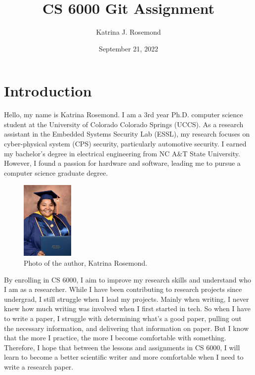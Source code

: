 \documentclass{article}
\title{CS 6000 Git Assignment}
\author{Katrina J. Rosemond}
\date{September 21, 2022}
\begin{document}
\maketitle

\section{Introduction}

Hello, my name is Katrina Rosemond. I am a 3rd year Ph.D. computer science 
student at the University of Colorado Colorado Springs (UCCS). As a 
research assistant in the Embedded Systems Security Lab (ESSL), my 
research focuses on cyber-physical system (CPS) security, particularly 
automotive security. I earned my bachelor's degree in electrical 
engineering from NC A\&T State University. However, I found a passion for 
hardware and software, leading me to pursue a computer science graduate 
degree. 

\begin{figure}[ht]
    \centering
    \includegraphics[width= 1in, height= 1.5in]{RosemondGrad.jpg}
    \caption{Photo of the author, Katrina Rosemond.}
\end{figure}

By enrolling in CS 6000, I aim to improve my research skills and 
understand who I am as a researcher. While I have been contributing to 
research projects since undergrad, I still struggle when I lead my 
projects. Mainly when writing, I never knew how much writing was involved 
when I first started in tech. So when I have to write a paper, I struggle 
with determining what's a good paper, pulling out the necessary 
information, and delivering that information on paper. But I know that the 
more I practice, the more I become comfortable with something. Therefore, 
I hope that between the lessons and assignments in CS 6000, I will learn 
to become a better scientific writer and more comfortable when I need to 
write a research paper.

\enddocument
\end{document}
